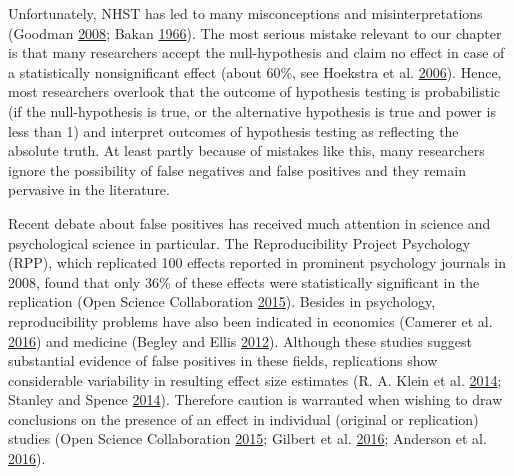 \documentclass[a5paper]{book}
\begin{document}
Unfortunately, NHST has led to many misconceptions and
misinterpretations (Goodman
\protect\hyperlink{ref-doi:10.1053ux2fj.seminhematol.2008.04.003}{2008};
Bakan \protect\hyperlink{ref-doi:10.1037ux2fh0020412}{1966}). The most
serious mistake relevant to our chapter is that many researchers accept
the null-hypothesis and claim no effect in case of a statistically
nonsignificant effect (about 60\%, see Hoekstra et al.
\protect\hyperlink{ref-doi:10.3758ux2fbf03213921}{2006}). Hence, most
researchers overlook that the outcome of hypothesis testing is
probabilistic (if the null-hypothesis is true, or the alternative
hypothesis is true and power is less than 1) and interpret outcomes of
hypothesis testing as reflecting the absolute truth. At least partly
because of mistakes like this, many researchers ignore the possibility
of false negatives and false positives and they remain pervasive in the
literature.

Recent debate about false positives has received much attention in
science and psychological science in particular. The Reproducibility
Project Psychology (RPP), which replicated 100 effects reported in
prominent psychology journals in 2008, found that only 36\% of these
effects were statistically significant in the replication (Open Science
Collaboration
\protect\hyperlink{ref-doi:10.1126ux2fscience.aac4716}{2015}). Besides
in psychology, reproducibility problems have also been indicated in
economics (Camerer et al.
\protect\hyperlink{ref-doi:10.1126ux2fscience.aaf0918}{2016}) and
medicine (Begley and Ellis
\protect\hyperlink{ref-doi:10.1038ux2f483531a}{2012}). Although these
studies suggest substantial evidence of false positives in these fields,
replications show considerable variability in resulting effect size
estimates (R. A. Klein et al.
\protect\hyperlink{ref-doi:10.1027ux2f1864-9335ux2fa000178}{2014};
Stanley and Spence
\protect\hyperlink{ref-doi:10.1177ux2f1745691614528518}{2014}).
Therefore caution is warranted when wishing to draw conclusions on the
presence of an effect in individual (original or replication) studies
(Open Science Collaboration
\protect\hyperlink{ref-doi:10.1126ux2fscience.aac4716}{2015}; Gilbert et
al. \protect\hyperlink{ref-doi:10.1126ux2fscience.aad7243}{2016};
Anderson et al.
\protect\hyperlink{ref-doi:10.1126ux2fscience.aad9163}{2016}).
\end{document}
